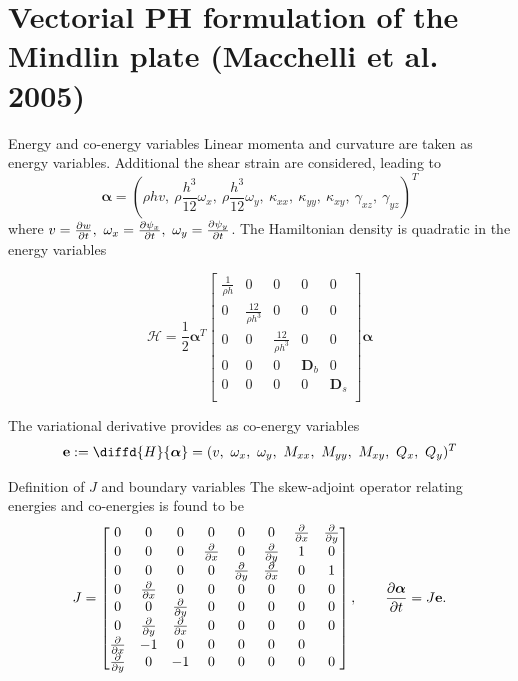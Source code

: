\documentclass{beamer}
\begin{document}
\section{Vectorial PH formulation of the Mindlin plate (Macchelli et al. 2005)}

\begin{frame}{Energy and co-energy variables}
Linear momenta and curvature are taken as energy variables. Additional the shear strain are considered, leading to 
\begin{equation*}
\bm{\alpha} = \left(\rho h v,\ \rho \frac{h^3}{12} \omega_x,\ \rho \frac{h^3}{12} \omega_y,\ \kappa_{xx},\ \kappa_{yy},\ \kappa_{xy},\ \gamma_{xz},\ \gamma_{yz} \right)^T
\end{equation*}
where $v = \diffp{w}{t},\ \omega_x = \diffp{\psi_x}{t},\ \omega_y = \diffp{\psi_y}{t}$. The Hamiltonian density is quadratic in the energy variables

\begin{equation*}
\mathcal{H} = \frac{1}{2} \bm{\alpha}^T \begin{bmatrix}
\frac{1}{\rho h} & 0 & 0 & 0 & 0 \\
0 & \frac{12}{\rho h^3} & 0 & 0 & 0 \\
0 & 0 & \frac{12}{\rho h^3} & 0 & 0 \\
0 & 0 & 0 & \bm{D}_b & 0 \\
0 & 0 & 0 &  0 & \bm{D}_s \\
\end{bmatrix} \bm{\alpha} 
\end{equation*}

The variational derivative provides as co-energy variables
\begin{equation*}
\mathbf{e} := \diffd{H}{\bm{\alpha}} = (v,\ \omega_x, \ \omega_y,\ M_{xx},\ M_{yy},\ M_{xy},\ Q_x, \ Q_y)^T
\end{equation*}
\end{frame}

\begin{frame}{Definition of $J$ and boundary variables}
The skew-adjoint operator relating energies and co-energies is found to be
\begin{equation*}
J = 
\begin{bmatrix}
0 & 0 & 0 & 0 & 0 & 0 & \diffp{}{x} & \diffp{}{y} \\
0 & 0 & 0 & \diffp{}{x} & 0 & \diffp{}{y} & 1 & 0 \\
0 & 0 & 0 & 0 & \diffp{}{y} & \diffp{}{x} & 0 & 1 \\
0 & \diffp{}{x} & 0 & 0 & 0 & 0 & 0 & 0\\
0 & 0 & \diffp{}{y} & 0 & 0 & 0 & 0 & 0\\
0 & \diffp{}{y} & \diffp{}{x} & 0 & 0 & 0 & 0 & 0\\
\diffp{}{x} & -1 & 0 & 0 & 0 & 0 & 0\\
\diffp{}{y} & 0 & -1 & 0 & 0 & 0 & 0 & 0\\
\end{bmatrix}, 	\qquad
\diffp{\bm{\alpha}}{t} = J \mathbf{e}.
\end{equation*}
\end{frame}
\end{document}
